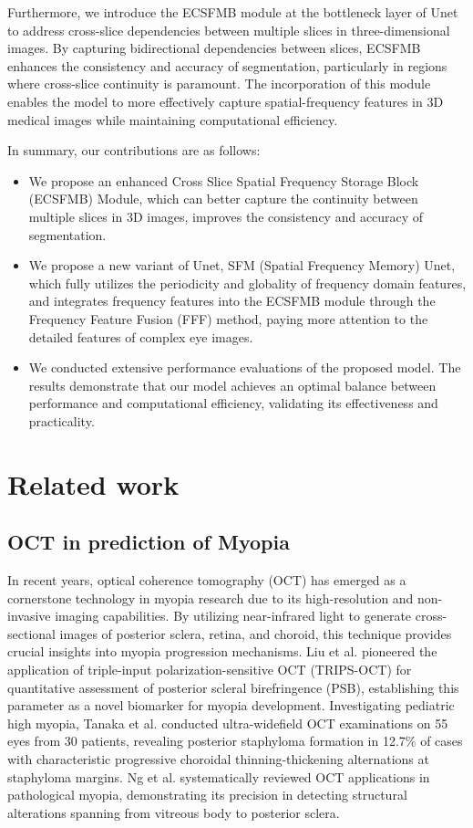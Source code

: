 \documentclass[AMA,Times1COL]{WileyNJDv5} %
\begin{document}
Furthermore, we introduce the ECSFMB module at the bottleneck layer of Unet to address cross-slice dependencies between multiple slices in three-dimensional images. By capturing bidirectional dependencies between slices, ECSFMB enhances the consistency and accuracy of segmentation, particularly in regions where cross-slice continuity is paramount. The incorporation of this module enables the model to more effectively capture spatial-frequency features in 3D medical images while maintaining computational efficiency.

In summary, our contributions are as follows:
\begin{itemize}
    \item We propose an enhanced Cross Slice Spatial Frequency Storage Block (ECSFMB) Module, which can better capture the continuity between multiple slices in 3D images, improves the consistency and accuracy of segmentation.
    \item We propose a new variant of Unet, SFM (Spatial Frequency Memory) Unet, which fully utilizes the periodicity and globality of frequency domain features, and integrates frequency features into the ECSFMB module through the Frequency Feature Fusion (FFF) method, paying more attention to the detailed features of complex eye images.
    \item We conducted extensive performance evaluations of the proposed model. The results demonstrate that our model achieves an optimal balance between performance and computational efficiency, validating its effectiveness and practicality.
\end{itemize}


\section{Related work}
\subsection{OCT in prediction of Myopia}
In recent years, optical coherence tomography (OCT) has emerged as a cornerstone technology in myopia research due to its high-resolution and non-invasive imaging capabilities. By utilizing near-infrared light to generate cross-sectional images of posterior sclera, retina, and choroid, this technique provides crucial insights into myopia progression mechanisms\cite{zuo2025machine}. Liu et al. \cite{liu2023posterior} pioneered the application of triple-input polarization-sensitive OCT (TRIPS-OCT) for quantitative assessment of posterior scleral birefringence (PSB), establishing this parameter as a novel biomarker for myopia development. Investigating pediatric high myopia, Tanaka et al.\cite{tanaka2019posterior} conducted ultra-widefield OCT examinations on 55 eyes from 30 patients, revealing posterior staphyloma formation in 12.7\% of cases with characteristic progressive choroidal thinning-thickening alternations at staphyloma margins. Ng et al. \cite{ng2016advances} systematically reviewed OCT applications in pathological myopia, demonstrating its precision in detecting structural alterations spanning from vitreous body to posterior sclera.
\end{document}
